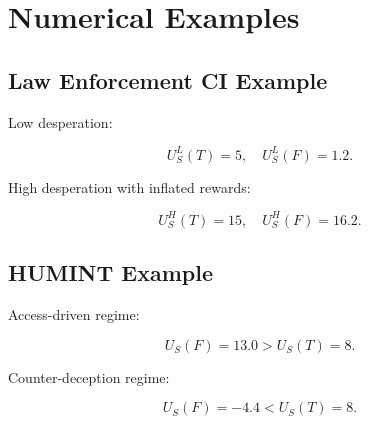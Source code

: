 \section{Numerical Examples}

\subsection{Law Enforcement CI Example}

Low desperation:


\[
U_S^L(T) = 5, \quad U_S^L(F) = 1.2.
\]



High desperation with inflated rewards:


\[
U_S^H(T) = 15, \quad U_S^H(F) = 16.2.
\]



\subsection{HUMINT Example}

Access-driven regime:


\[
U_S(F) = 13.0 > U_S(T) = 8.
\]



Counter-deception regime:


\[
U_S(F) = -4.4 < U_S(T) = 8.
\]


